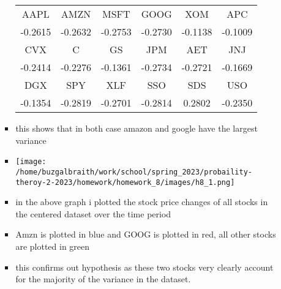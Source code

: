 \documentclass[12pt,twoside]{article}
\begin{document}
\begin{enumerate}
\begin{enumerate}
\begin{itemize}
\begin{center}
    \begin{tabular}{c|c|c|c|c|c}
    AAPL & AMZN & MSFT & GOOG & XOM & APC\\
    -0.2615 & -0.2632 & -0.2753 & -0.2730 & -0.1138 & -0.1009\\
    \hline
    CVX & C & GS & JPM & AET & JNJ\\
    -0.2414 & -0.2276 & -0.1361 & -0.2734 & -0.2721 & -0.1669\\
    \hline
    DGX & SPY & XLF & SSO & SDS & USO\\
    -0.1354 & -0.2819 & -0.2701 & -0.2814 & 0.2802 & -0.2350\\
    \end{tabular}
    \end{center}
  \item this shows that in both case amazon and google have the largest variance
  \item \texttt{[image: /home/buzgalbraith/work/school/spring\_2023/probaility-theroy-2-2023/homework/homework\_8/images/h8\_1.png]}
    \item in the above graph i plotted the stock price changes of all stocks in the centered dataset over the time period
    \item Amzn is plotted in blue and GOOG is plotted in red, all other stocks are plotted in green 
    \item this confirms out hypothesis as these two stocks very clearly account for the majority of the variance in the dataset. 
\end{itemize}
    

\end{enumerate}
\end{enumerate}
\end{document}
